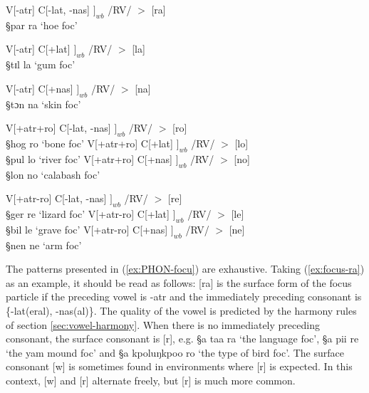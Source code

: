 \begin{exe}
\ex\label{ex:PHON-focu} 
\begin{xlist}
\ex\label{ex:focus-ra} 
 V[{\sc -atr}]  C[{\sc -lat}, {\sc -nas}]  $]_{wb}$ /RV/   $>$ [ra] \\ 
{\S par ra}  `hoe {\sc foc}'

\ex\label{ex:} 
 V[{\sc -atr}]  C[{\sc +lat}]   $]_{wb}$ /RV/   $>$ [la] \\
{\S tɪl la}  `gum {\sc foc}'

\ex\label{ex:}
 V[{\sc -atr}] C[{\sc +nas}]   $]_{wb}$  /RV/   $>$ [na]\\
 {\S tɔn na} `skin {\sc foc}'

\ex\label{ex:} 
 V[{\sc +atr}{\sc +ro}]  C[{\sc -lat}, {\sc -nas}] $]_{wb}$  /RV/   $>$ [ro] \\
 {\S hog ro} `bone {\sc foc}'
\ex\label{ex:} 
  V[{\sc +atr}{\sc +ro}]  C[{\sc +lat}] $]_{wb}$  /RV/   $>$ [lo] \\
 {\S pul lo} `river {\sc foc}'
\ex\label{ex:}
  V[{\sc +atr}{\sc +ro}]  C[{\sc +nas}] $]_{wb}$ /RV/   $>$ [no]\\
 {\S lon no} `calabash {\sc foc}'

\ex\label{ex:} 
  V[{\sc +atr}{\sc -ro}]  C[{\sc -lat}, {\sc -nas}] $]_{wb}$  /RV/   $>$ [re] \\
 {\S ger re} `lizard {\sc foc}'
\ex\label{ex:} 
  V[{\sc +atr}{\sc -ro}] C[{\sc +lat}]  $]_{wb}$  /RV/   $>$ [le] \\
 {\S bil le} `grave {\sc foc}'
\ex\label{ex:}
 V[{\sc +atr}{\sc -ro}] C[{\sc +nas}]   $]_{wb}$  /RV/   $>$ [ne]\\
 {\S nen ne} `arm {\sc foc}'



\end{xlist}
\end{exe}


The patterns presented in (\ref{ex:PHON-focu}) are exhaustive. Taking
(\ref{ex:focus-ra}) as an example, it should be read as follows: [ra] is the
surface form of the focus particle if the preceding vowel is   {\sc -atr} and
the immediately preceding consonant is \{{\sc -lat(eral), -nas(al)}\}. The
quality
of the vowel is predicted by the harmony rules of section
\ref{sec:vowel-harmony}.  When there is
no immediately preceding consonant,  the surface consonant is [r], e.g. {\S a
taa
ra} `the language {\sc foc}', {\S a pii re} `the yam mound {\sc foc}' and {\S a
kpoluŋkpoo ro} `the type of bird {\sc foc}'.   The surface consonant  [w] is
sometimes found in  environments where  [r] is expected. In this context,  
[w] and
[r] alternate freely, but   [r] is much more common.



